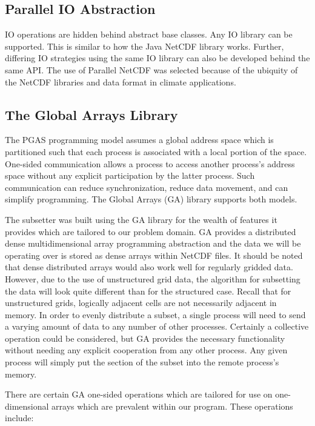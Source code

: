 \subsection{Parallel IO Abstraction}

IO operations are hidden behind abstract base classes.  Any IO library can be
supported.  This is similar to how the Java NetCDF library
works\cite{JavaNetCDF}.  Further, differing IO strategies using the same IO
library can also be developed behind the same API.  The use of Parallel NetCDF
was selected because of the ubiquity of the NetCDF libraries and data format
in climate applications.

\subsection{The Global Arrays Library}

The PGAS programming model assumes a global address space which is partitioned
such that each process is associated with a local portion of the space.
One-sided communication allows a process to access another process's address
space without any explicit participation by the latter process.  Such
communication can reduce synchronization, reduce data movement, and can
simplify programming.  The Global Arrays (GA) library supports both models.

The subsetter was built using the GA library for the wealth of features it
provides which are tailored to our problem domain.  GA provides a distributed
dense multidimensional array programming abstraction and the data we will be
operating over is stored as dense arrays within NetCDF files.  It should be
noted that dense distributed arrays would also work well for regularly gridded
data.  However, due to the use of unstructured grid data, the algorithm for
subsetting the data will look quite different than for the structured case.
Recall that for unstructured grids, logically adjacent cells are not
necessarily adjacent in memory.  In order to evenly distribute a subset, a
single process will need to send a varying amount of data to any number of
other processes.  Certainly a collective operation could be considered, but GA
provides the necessary functionality without needing any explicit cooperation
from any other process.  Any given process will simply put the section of the
subset into the remote process's memory.

There are certain GA one-sided operations which are tailored for use on
one-dimensional arrays which are prevalent within our program.  These
operations include:

